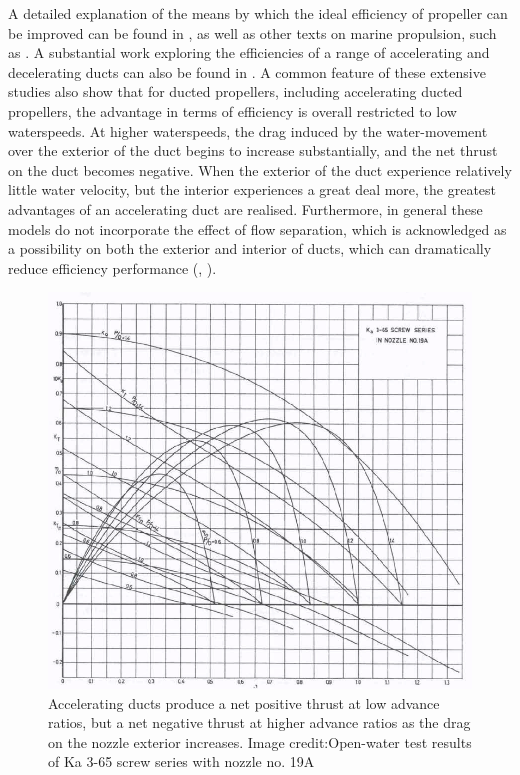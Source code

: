 \documentclass{article}\usepackage[]{graphicx}\usepackage[]{color}
\begin{document}
A detailed explanation of the means by which the ideal efficiency of propeller can be improved can be found in \cite[213-222]{lewis1988}, as well as other texts on marine propulsion, such as \cite{carlton2007}. A substantial work exploring the efficiencies of a range of accelerating and decelerating ducts can also be found in \cite{oosterveld1970}.  A common feature of these extensive studies also show that for ducted propellers, including accelerating ducted propellers, the advantage in terms of efficiency is overall restricted to low waterspeeds.  At higher waterspeeds, the drag induced by the water-movement over the exterior of the duct begins to increase substantially, and the net thrust on the duct becomes negative.  When the exterior of the duct experience relatively little water velocity, but the interior experiences a great deal more, the greatest advantages of an accelerating duct are realised.  Furthermore, in general these models do not incorporate the effect of flow separation, which is acknowledged as a possibility on both the exterior and interior of ducts, which can dramatically reduce efficiency performance (\cite[20]{oosterveld1970}, \cite[214]{lewis1988}).

\begin{figure}
\includegraphics[width=\textwidth]{DuctedEfficiency.png}
\caption{Accelerating ducts produce a net positive thrust at low advance ratios, but a net negative thrust at higher advance ratios as the drag on the nozzle exterior increases. Image credit:Open-water test results of Ka 3-65 screw series with nozzle no. 19A \parencite{oosterveld1970}}
\label{fig:DuctedEfficiency.png}
\end{figure}
\end{document}
